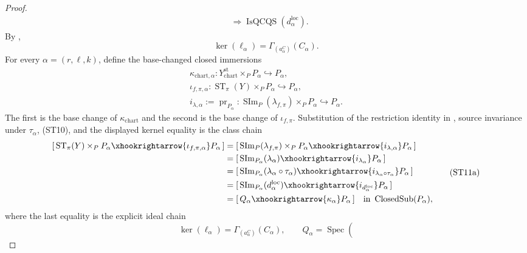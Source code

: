 \begin{proof}
\[\begin{aligned}
      &\Longrightarrow\operatorname{IsQCQS}(d^{\mathrm{loc}}_\alpha).
  \end{aligned}                                                     \tag{ST10a}
  \]
  By ,
  \[
    \ker(\ell_\alpha)
      =\Gamma_{(a^C_\alpha)}(C_\alpha).
  \]
  For every $\alpha=(r,\ell,k)$, define the base-changed closed immersions
  \[
  \begin{gathered}
    \kappa_{\mathrm{chart},\alpha}\colon
      Y^{\mathrm{st}}_{\mathrm{chart}}\times_PP_\alpha
        \hookrightarrow P_\alpha,\\
    \iota_{f,\pi,\alpha}\colon
      \operatorname{ST}_\pi(Y)\times_PP_\alpha
        \hookrightarrow P_\alpha,\\
    i_{\lambda,\alpha}:=\operatorname{pr}_{P_\alpha}\colon
      \operatorname{SIm}_P(\lambda_{f,\pi})\times_PP_\alpha
        \hookrightarrow P_\alpha.
  \end{gathered}
  \]
  The first is the base change of $\kappa_{\mathrm{chart}}$ and the second
  is the base change of $\iota_{f,\pi}$.  Substitution of the restriction
  identity in , source
  invariance under $\tau_\alpha$, (ST10), and the displayed kernel equality
  is the class chain
  \[
  \begin{aligned}
    [\,\operatorname{ST}_\pi(Y)\times_PP_\alpha
      \xhookrightarrow{\iota_{f,\pi,\alpha}}P_\alpha\,]
      &=[\,\operatorname{SIm}_P(\lambda_{f,\pi})\times_PP_\alpha
        \xhookrightarrow{i_{\lambda,\alpha}}P_\alpha\,]\\
      &=[\,\operatorname{SIm}_{P_\alpha}(\lambda_\alpha)
        \xhookrightarrow{i_{\lambda_\alpha}}P_\alpha\,]\\
      &=[\,\operatorname{SIm}_{P_\alpha}
          (\lambda_\alpha\circ\tau_\alpha)
        \xhookrightarrow{i_{\lambda_\alpha\circ\tau_\alpha}}P_\alpha\,]\\
      &=[\,\operatorname{SIm}_{P_\alpha}(d^{\mathrm{loc}}_\alpha)
        \xhookrightarrow{i_{d^{\mathrm{loc}}_\alpha}}P_\alpha\,]\\
      &=[\,Q_\alpha\xhookrightarrow{\kappa_\alpha}P_\alpha\,]
      \quad\text{in }\operatorname{ClosedSub}(P_\alpha),
  \end{aligned}                                                    \tag{ST11a}
  \]
  where the last equality is the explicit ideal chain
  \[
    \ker(\ell_\alpha)
      =\Gamma_{(a^C_\alpha)}(C_\alpha),
    \qquad
    Q_\alpha
      =\operatorname{Spec}\!\left(
\]
\end{proof}
